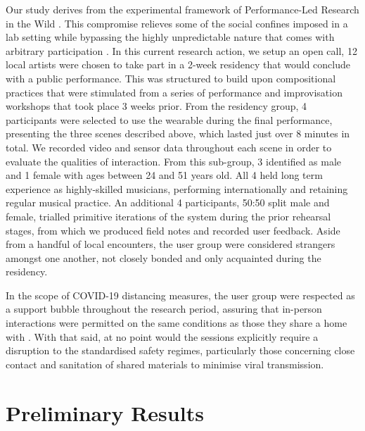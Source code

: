 Our study derives from the experimental framework of Performance-Led Research in the Wild \citep{benford_performance-led_2013}. This compromise relieves some of the social confines imposed in a lab setting while bypassing the highly unpredictable nature that comes with arbitrary participation \citep{heron_par_2017}. In this current research action, we setup an open call, 12 local artists were chosen to take part in a 2-week residency that would conclude with a public performance. This was structured to build upon compositional practices that were stimulated from a series of performance and improvisation workshops that took place 3 weeks prior. From the residency group, 4 participants were selected to use the wearable during the final performance, presenting the three scenes described above, which lasted just over 8 minutes in total. We recorded video and sensor data throughout each scene in order to evaluate the qualities of interaction. From this sub-group, 3 identified as male and 1 female with ages between 24 and 51 years old. All 4 held long term experience as highly-skilled musicians, performing internationally and retaining regular musical practice. An additional 4 participants, 50:50 split male and female, trialled primitive iterations of the system during the prior rehearsal stages, from which we produced field notes and recorded user feedback. Aside from a handful of local encounters, the user group were considered strangers amongst one another, not closely bonded and only acquainted during the residency. 

In the scope of COVID-19 distancing measures, the user group were respected as a support bubble throughout the research period, assuring that in-person interactions were permitted on the same conditions as those they share a home with \citep{trotter_ways_2021}. With that said, at no point would the sessions explicitly require a disruption to the standardised safety regimes, particularly those concerning close contact and sanitation of shared materials to minimise viral transmission.


\section{Preliminary Results}
\label{sec:results}

